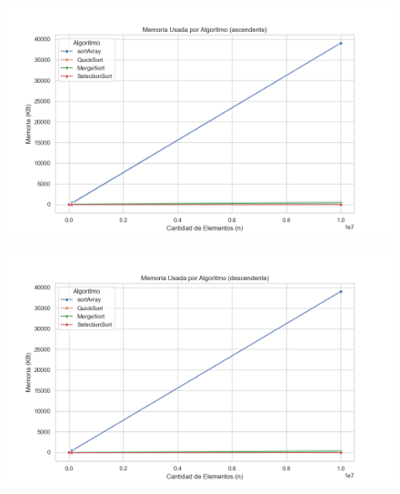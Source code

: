 \begin{figure}[H]
    \centering
    \begin{minipage}[t]{1\textwidth}
        \includegraphics[width=\textwidth]{../code/sorting/data/plots/memoria_vs_algoritmo_ascendente.png}
     \end{minipage}%
    \caption{}
    \label{fig:scatterplot_3}
\end{figure}

\begin{figure}[H]
    \centering
    \begin{minipage}[t]{1\textwidth}
        \includegraphics[width=\textwidth]{../code/sorting/data/plots/memoria_vs_algoritmo_descendente.png}
     \end{minipage}%
    \caption{}
    \label{fig:scatterplot_3}
\end{figure}

